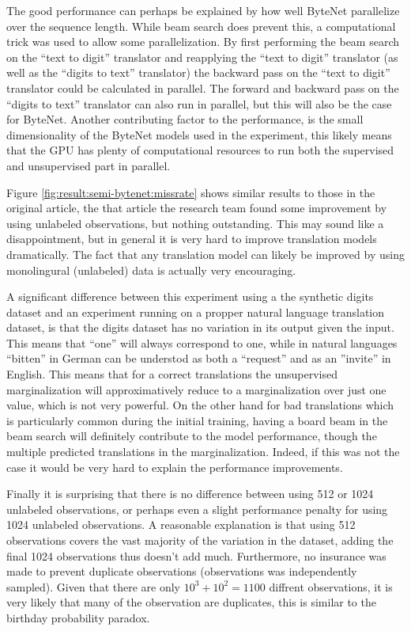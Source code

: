The good performance can perhaps be explained by how well ByteNet parallelize over the sequence length. While beam search does prevent this, a computational trick was used to allow some parallelization. By first performing the beam search on the ``text to digit'' translator and reapplying the ``text to digit'' translator (as well as the ``digits to text'' translator) the backward pass on the ``text to digit'' translator could be calculated in parallel. The forward and backward pass on the ``digits to text'' translator can also run in parallel, but this will also be the case for ByteNet. Another contributing factor to the performance, is the small dimensionality of the ByteNet models used in the experiment, this likely means that the GPU has plenty of computational resources to run both the supervised and unsupervised part in parallel.

Figure \ref{fig:result:semi-bytenet:missrate} shows similar results to those in the original article, the that article the research team found some improvement by using unlabeled observations, but nothing outstanding. This may sound like a disappointment, but in general it is very hard to improve translation models dramatically. The fact that any translation model can likely be improved by using monolingural (unlabeled) data is actually very encouraging.

A significant difference between this experiment using a the synthetic digits dataset and an experiment running on a propper natural language translation dataset, is that the digits dataset has no variation in its output given the input. This means that ``one'' will always correspond to one, while in natural languages ``bitten'' in German can be understod as both a ``request'' and as an ''invite'' in English. This means that for a correct translations the unsupervised marginalization will approximatively reduce to a marginalization over just one value, which is not very powerful. On the other hand for bad translations which is particularly common during the initial training, having a board beam in the beam search will definitely contribute to the model performance, though the multiple predicted translations in the marginalization. Indeed, if this was not the case it would be very hard to explain the performance improvements. 


Finally it is surprising that there is no difference between using 512 or 1024 unlabeled observations, or perhaps even a slight performance penalty for using 1024 unlabeled observations. A reasonable explanation is that using 512 observations covers the vast majority of the variation in the dataset, adding the final 1024 observations thus doesn't add much. Furthermore, no insurance was made to prevent duplicate observations (observations was independently sampled). Given that there are only $10^3 + 10^2 = 1100$ diffrent observations, it is very likely that many of the observation are duplicates, this is similar to the birthday probability paradox.